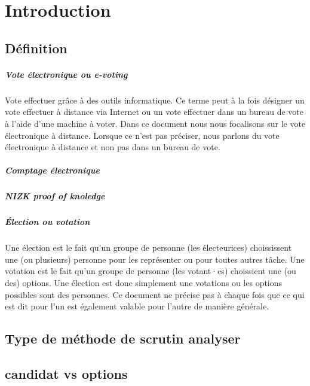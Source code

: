 \documentclass[../report]{subfiles}
\begin{document}
  \chapter{Introduction}

  \section{Définition}

  \paragraph{Vote électronique ou e-voting}
  Vote effectuer grâce à des outils informatique.
  Ce terme peut à la fois désigner un vote effectuer à distance via Internet ou un vote effectuer
  dans un bureau de vote à l'aide d'une machine à voter.
  Dans ce document nous nous focalisons sur le vote électronique à distance.
  Lorsque ce n'est pas préciser, nous parlons du vote électronique à distance et non pas dans un bureau de vote.

  \paragraph{Comptage électronique}
  \todo{}
  
  \paragraph{NIZK proof of knoledge}
  \todo{}

  \paragraph{Élection ou votation}
  Une élection est le fait qu'un groupe de personne (les électeurices) choississent une (ou plusieurs) personne
  pour les représenter ou pour toutes autres tâche.
  Une votation est le fait qu'un groupe de personne (les votant·es) choissient une (ou des) options.
  Une élection est donc simplement une votations ou les options possibles sont des personnes.
  Ce document ne précise pas à chaque fois que ce qui est dit pour l'un est également valable pour l'autre de 
  manière générale.



  \section{Type de méthode de scrutin analyser}
  \section{candidat vs options}
\end{document}
